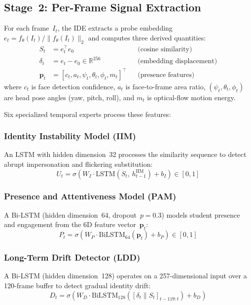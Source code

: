 \documentclass[journal]{IEEEtran}
\begin{document}
\subsection{Stage~2: Per-Frame Signal Extraction}

For each frame~$I_t$, the IDE extracts a probe embedding $e_t = f_\theta(I_t)/\lVert f_\theta(I_t) \rVert_2$ and computes three derived quantities:
\begin{align}
    S_t &= e_t^\top e_0 & & \text{(cosine similarity)} \label{eq:sim} \\
    \delta_t &= e_t - e_0 \in \mathbb{R}^{256} & & \text{(embedding displacement)} \label{eq:disp} \\
    \mathbf{p}_t &= [c_t, a_t, \psi_t, \theta_t, \phi_t, m_t]^\top & & \text{(presence features)} \label{eq:pres}
\end{align}
where $c_t$ is face detection confidence, $a_t$ is face-to-frame area ratio, $(\psi_t, \theta_t, \phi_t)$ are head pose angles (yaw, pitch, roll), and $m_t$ is optical-flow motion energy.

Six specialized temporal experts process these features:

\subsubsection{Identity Instability Model (IIM)}
An LSTM with hidden dimension~32 processes the similarity sequence to detect abrupt impersonation and flickering substitution:
\begin{equation}
    U_t = \sigma\!\left(W_I \cdot \mathrm{LSTM}(S_t,\, h_{t-1}^{\mathrm{IIM}}) + b_I\right) \in [0,1]
    \label{eq:iim}
\end{equation}

\subsubsection{Presence and Attentiveness Model (PAM)}
A Bi-LSTM (hidden dimension~64, dropout~$p{=}0.3$) models student presence and engagement from the 6D feature vector~$\mathbf{p}_t$:
\begin{equation}
    P_t = \sigma\!\left(W_P \cdot \mathrm{BiLSTM}_{64}(\mathbf{p}_t) + b_P\right) \in [0,1]
    \label{eq:pam}
\end{equation}

\subsubsection{Long-Term Drift Detector (LDD)}
A Bi-LSTM (hidden dimension~128) operates on a 257-dimensional input over a 120-frame buffer to detect gradual identity drift:
\begin{equation}
    D_t = \sigma\!\left(W_D \cdot \mathrm{BiLSTM}_{128}([\delta_t \| S_t]_{t-119:t}) + b_D\right)
    \label{eq:ldd}
\end{equation}
\end{document}
